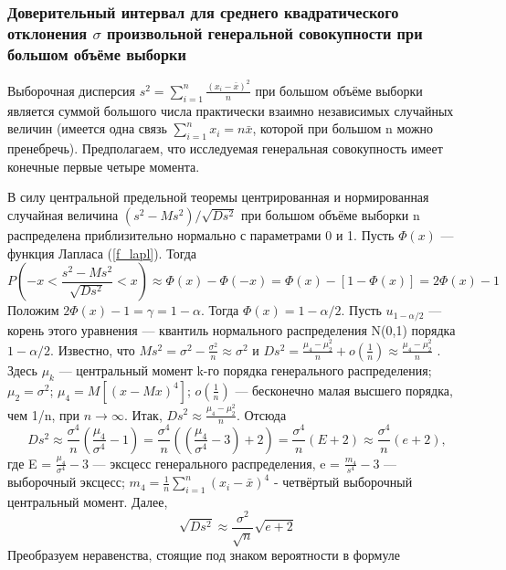 \documentclass[12pt]{article}
\begin{document}
	\subsubsection{Доверительный интервал для среднего квадратического отклонения $\sigma$ произвольной генеральной совокупности при большом объёме выборки}
	Выборочная дисперсия $s^{2} = \sum_{i = 1}^{n}{\frac{(x_{i} - \bar{x})^{2}}{n}}$ при большом объёме выборки является суммой большого числа практически взаимно независимых случайных величин (имеется одна связь $\sum_{i=1}^{n}{x_{i}} = n\bar{x}$, которой при большом n можно пренебречь). Предполагаем, что исследуемая генеральная совокупность имеет конечные первые четыре момента.
	
	В силу центральной предельной теоремы центрированная и нормированная случайная величина $(s^{2}-Ms^{2})/\sqrt{D s^{2}}$ при большом объёме выборки n распределена приблизительно нормально с параметрами 0 и 1. Пусть $\Phi(x)$ — функция Лапласа (\ref{f_lapl}). Тогда
	\begin{equation}
		P\left(-x < \frac{s^{2}-Ms^{2}}{\sqrt{D s^{2}}} < x\right)
		\approx \Phi(x) - \Phi(-x)=\Phi(x) - [1 - \Phi(x)] = 2\Phi(x) - 1
		\label{P_as_sigma}
	\end{equation}
	Положим $2\Phi(x)-1 = \gamma = 1-\alpha$. Тогда $\Phi(x) = 1-\alpha/2$. Пусть $u_{1-\alpha/2}$ — корень этого уравнения — квантиль нормального распределения N(0,1) порядка $1-\alpha/2$. Известно, что $Ms^{2} = \sigma^{2} -\frac{\sigma^{2}}{n} \approx \sigma^{2} \text{ и } D s^{2} = \frac{\mu_{4} -\mu_{2}^{2}}{n} + o(\frac{1}{n}) \approx \frac{\mu_{4} -\mu_{2}^{2}}{n}$ . Здесь $\mu_{k}$ — центральный момент k-го порядка генерального распределения; $\mu_{2} = \sigma^2$; $\mu_4 = M[(x-Mx)^4]$; $o(\frac{1}{n})$ — бесконечно малая высшего порядка, чем 1/n, при $n\rightarrow \infty$. Итак, $D s^{2} \approx \frac{\mu_{4} -\mu_{2}^{2}}{n}$. Отсюда
	\begin{equation}
		D s^{2} \approx \frac{\sigma^{4}}{n}(\frac{\mu_{4}}{\sigma^{4}} - 1) = 
		\frac{\sigma^{4}}{n}((\frac{\mu_{4}}{\sigma^{4}} - 3) + 2) = \frac{\sigma^{4}}{n}(E + 2) \approx \frac{\sigma^{4}}{n}(e + 2),
		\label{Ds_2}
	\end{equation}
	где E = $\frac{\mu_{4}}{\sigma^{4}} - 3$ — эксцесс генерального распределения, e = $\frac{m_{4}}{s^{4}} - 3$ — выборочный эксцесс; $m_{4} = \frac{1}{n}\sum_{i =1}^{n}{(x_{i} - \bar{x})^{4}}$  - четвёртый выборочный центральный момент. Далее,
	\begin{equation}
		\sqrt{D s^{2}} \approx \frac{\sigma^{2}}{\sqrt{n}}\sqrt{e + 2}
		\label{sqrt_Ds}
	\end{equation}
	Преобразуем неравенства, стоящие под знаком вероятности в формуле
	
\end{document}
